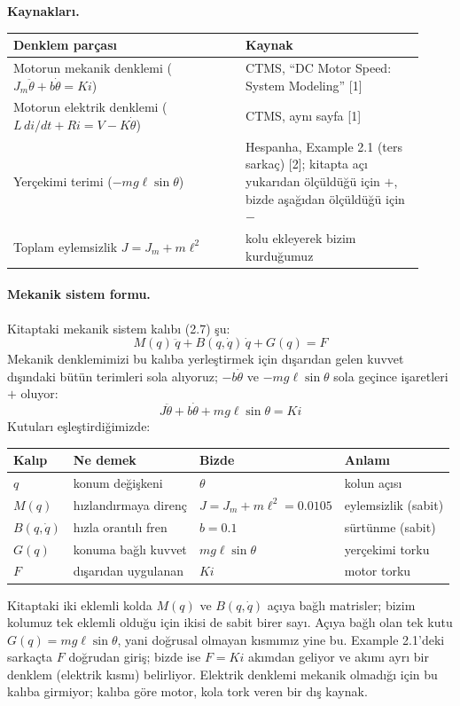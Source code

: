 \documentclass[11pt,a4paper]{article}
\begin{document}
\textbf{Kaynakları.}
\begin{center}
\begin{tabular}{p{0.52\linewidth}p{0.40\linewidth}}
\toprule
Denklem parçası & Kaynak\\
\midrule
Motorun mekanik denklemi ($J_m\ddot\theta + b\dot\theta = K i$) & CTMS, ``DC Motor Speed: System Modeling'' [1]\\
Motorun elektrik denklemi ($L\,di/dt + R i = V - K\dot\theta$) & CTMS, aynı sayfa [1]\\
Yerçekimi terimi ($-mg\ell\sin\theta$) & Hespanha, Example 2.1 (ters sarkaç) [2]; kitapta açı yukarıdan ölçüldüğü için $+$, bizde aşağıdan ölçüldüğü için $-$\\
Toplam eylemsizlik $J = J_m + m\ell^2$ & kolu ekleyerek bizim kurduğumuz\\
\bottomrule
\end{tabular}
\end{center}

\paragraph{Mekanik sistem formu.} Kitaptaki mekanik sistem kalıbı (2.7) şu:
\[
M(q)\,\ddot q + B(q,\dot q)\,\dot q + G(q) = F
\]
Mekanik denklemimizi bu kalıba yerleştirmek için dışarıdan gelen kuvvet dışındaki bütün terimleri sola alıyoruz; $-b\dot\theta$ ve $-mg\ell\sin\theta$ sola geçince işaretleri $+$ oluyor:
\[
J\ddot\theta + b\dot\theta + mg\ell\sin\theta = K i
\]
Kutuları eşleştirdiğimizde:

\begin{center}
\begin{tabular}{llll}
\toprule
Kalıp & Ne demek & Bizde & Anlamı\\
\midrule
$q$ & konum değişkeni & $\theta$ & kolun açısı\\
$M(q)$ & hızlandırmaya direnç & $J = J_m + m\ell^2 = 0.0105$ & eylemsizlik (sabit)\\
$B(q,\dot q)$ & hızla orantılı fren & $b = 0.1$ & sürtünme (sabit)\\
$G(q)$ & konuma bağlı kuvvet & $mg\ell\sin\theta$ & yerçekimi torku\\
$F$ & dışarıdan uygulanan & $K i$ & motor torku\\
\bottomrule
\end{tabular}
\end{center}

Kitaptaki iki eklemli kolda $M(q)$ ve $B(q,\dot q)$ açıya bağlı matrisler; bizim kolumuz tek eklemli olduğu için ikisi de sabit birer sayı. Açıya bağlı olan tek kutu $G(q) = mg\ell\sin\theta$, yani doğrusal olmayan kısmımız yine bu. Example 2.1'deki sarkaçta $F$ doğrudan giriş; bizde ise $F = K i$ akımdan geliyor ve akımı ayrı bir denklem (elektrik kısmı) belirliyor. Elektrik denklemi mekanik olmadığı için bu kalıba girmiyor; kalıba göre motor, kola tork veren bir dış kaynak.
\end{document}

